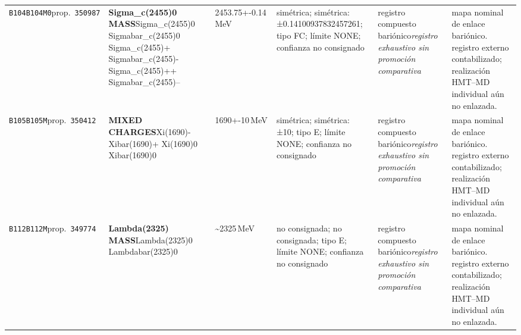 \begin{landscape}
\begin{longtable}{L{1.85cm}L{4.45cm}L{2.35cm}L{4.05cm}L{3.35cm}L{7.15cm}}
\texttt{B104}\newline \texttt{B104M0}\newline prop.\ \texttt{350987} & \textbf{Sigma\_\allowbreak{}c(2455)0 MASS}\newline Sigma\_\allowbreak{}c(2455)0 \textbar{}\allowbreak{} Sigmabar\_\allowbreak{}c(2455)0 \textbar{}\allowbreak{} Sigma\_\allowbreak{}c(2455)+ \textbar{}\allowbreak{} Sigmabar\_\allowbreak{}c(2455)- \textbar{}\allowbreak{} Sigma\_\allowbreak{}c(2455)++ \textbar{}\allowbreak{} Sigmabar\_\allowbreak{}c(2455)-- & 2453.75+-0.14\,MeV & simétrica; simétrica: ±0.14100937832457261; tipo FC; límite NONE; confianza no consignado & registro compuesto bariónico\newline \emph{registro exhaustivo sin promoción comparativa} & mapa nominal de enlace bariónico. registro externo contabilizado; realización HMT--MD individual aún no enlazada. \\
\texttt{B105}\newline \texttt{B105M}\newline prop.\ \texttt{350412} & \textbf{MIXED CHARGES}\newline Xi(1690)- \textbar{}\allowbreak{} Xibar(1690)+ \textbar{}\allowbreak{} Xi(1690)0 \textbar{}\allowbreak{} Xibar(1690)0 & 1690+-10\,MeV & simétrica; simétrica: ±10; tipo E; límite NONE; confianza no consignado & registro compuesto bariónico\newline \emph{registro exhaustivo sin promoción comparativa} & mapa nominal de enlace bariónico. registro externo contabilizado; realización HMT--MD individual aún no enlazada. \\
\texttt{B112}\newline \texttt{B112M}\newline prop.\ \texttt{349774} & \textbf{Lambda(2325) MASS}\newline Lambda(2325)0 \textbar{}\allowbreak{} Lambdabar(2325)0 & \textasciitilde{}2325\,MeV & no consignada; no consignada; tipo E; límite NONE; confianza no consignado & registro compuesto bariónico\newline \emph{registro exhaustivo sin promoción comparativa} & mapa nominal de enlace bariónico. registro externo contabilizado; realización HMT--MD individual aún no enlazada. \\

\end{longtable}
\end{landscape}
